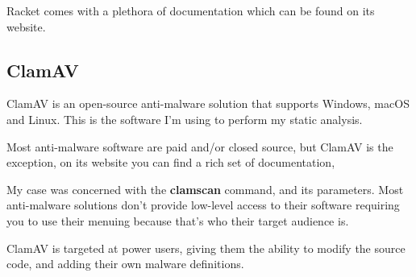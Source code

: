 Racket comes with a plethora of documentation which can be found on its website.

\subsection{ClamAV}
ClamAV is an open-source anti-malware solution that
supports Windows, macOS and Linux.
This is the software I'm using to perform my static analysis.

Most anti-malware software are paid and/or closed source,
but ClamAV is the exception, on its website you can find a rich set of documentation,

My case was concerned with the \textbf{clamscan} command, and its parameters.
Most anti-malware solutions don't provide low-level access to their software
requiring you to use their menuing because that's who their target audience is.

ClamAV is targeted at power users,
giving them the ability to modify the source code,
and adding their own malware definitions.
